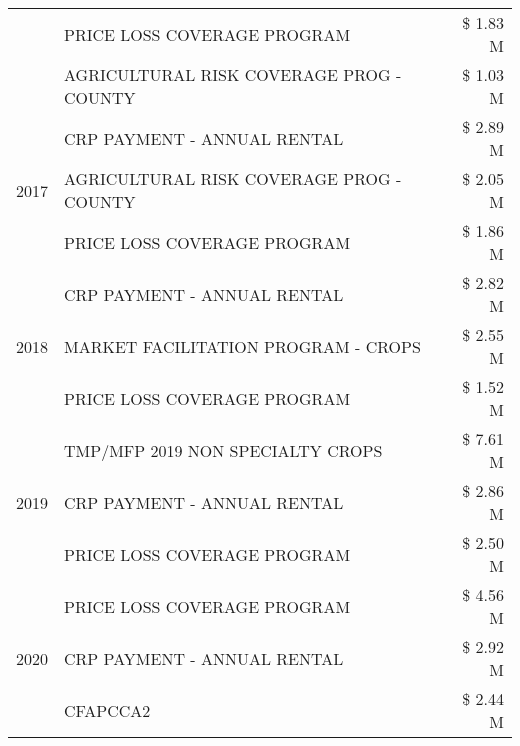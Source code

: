 \begin{tabular}{llr}
 & PRICE LOSS COVERAGE PROGRAM & \$ 1.83 M \\
 & AGRICULTURAL RISK COVERAGE PROG - COUNTY & \$ 1.03 M \\
\cline{1-3}
\multirow[t]{3}{*}{2017} & CRP PAYMENT - ANNUAL RENTAL & \$ 2.89 M \\
 & AGRICULTURAL RISK COVERAGE PROG - COUNTY & \$ 2.05 M \\
 & PRICE LOSS COVERAGE PROGRAM & \$ 1.86 M \\
\cline{1-3}
\multirow[t]{3}{*}{2018} & CRP PAYMENT - ANNUAL RENTAL & \$ 2.82 M \\
 & MARKET FACILITATION PROGRAM - CROPS & \$ 2.55 M \\
 & PRICE LOSS COVERAGE PROGRAM & \$ 1.52 M \\
\cline{1-3}
\multirow[t]{3}{*}{2019} & TMP/MFP 2019 NON SPECIALTY CROPS & \$ 7.61 M \\
 & CRP PAYMENT - ANNUAL RENTAL & \$ 2.86 M \\
 & PRICE LOSS COVERAGE PROGRAM & \$ 2.50 M \\
\cline{1-3}
\multirow[t]{3}{*}{2020} & PRICE LOSS COVERAGE PROGRAM & \$ 4.56 M \\
 & CRP PAYMENT - ANNUAL RENTAL & \$ 2.92 M \\
 & CFAPCCA2 & \$ 2.44 M \\
\cline{1-3}
\bottomrule
\end{tabular}
